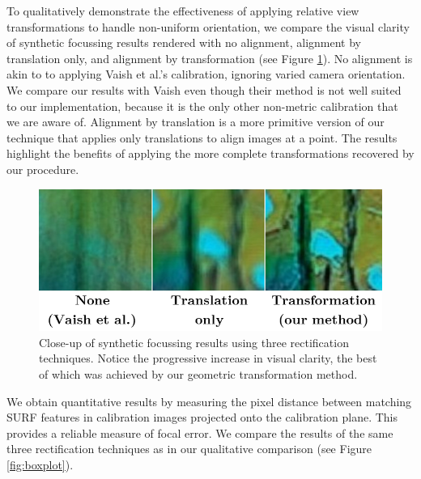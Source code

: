 \documentclass{article} \usepackage{acra}
\begin{document}
To qualitatively demonstrate the effectiveness of applying relative view
transformations to handle non-uniform orientation, we compare the visual clarity
of synthetic focussing results rendered with no alignment, alignment by
translation only, and alignment by transformation (see Figure
\ref{fig:visual_comparison}). No alignment is akin to to applying Vaish et al.'s
calibration, ignoring varied camera orientation. We compare our results with
Vaish even though their method is not well suited to our implementation, because
it is the only other non-metric calibration that we are aware of. Alignment by
translation is a more primitive version of our technique that applies only
translations to align images at a point. The results highlight the benefits of
applying the more complete transformations recovered by our procedure.

\begin{figure}[h] \centering
  \includegraphics[width=\columnwidth]{images/comparison}
  \caption{Close-up of synthetic focussing results using three rectification
    techniques. Notice the progressive increase in visual clarity, the best of
    which was achieved by our geometric transformation method.}
  \label{fig:visual_comparison}
\end{figure}

We obtain quantitative results by measuring the pixel distance between matching
SURF features in calibration images projected onto the calibration plane. This
provides a reliable measure of focal error. We compare the results of the same
three rectification techniques as in our qualitative comparison (see Figure
\ref{fig:boxplot}).
\end{document}
